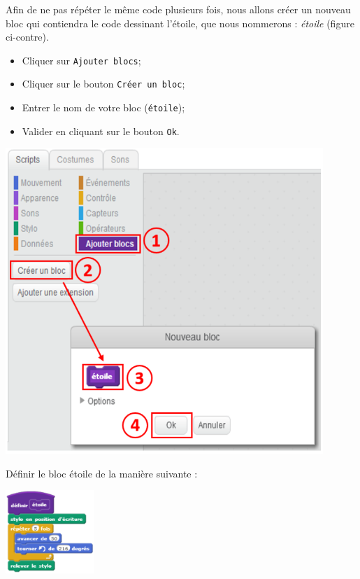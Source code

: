 \begin{minipage}[c]{0.55\linewidth}
Afin de ne pas répéter le même code plusieurs fois, nous allons créer un nouveau bloc qui contiendra le code dessinant l’étoile, que nous nommerons : \emph{étoile} (figure ci-contre).

\vspace{6pt}

  \begin{itemize}
    \item {} Cliquer sur \texttt{Ajouter blocs};
    \item {} Cliquer sur le bouton \texttt{Créer un bloc};
    \item {} Entrer le nom de votre bloc (\texttt{étoile});
    \item {} Valider en cliquant sur le bouton \texttt{Ok}.
  \end{itemize}
\end{minipage} \hfill%
\begin{minipage}[c]{0.38\linewidth}
  \includegraphics[width=0.9\textwidth]{./images/scratch03/fonction/Scratch_Fonctions_06}
\end{minipage}

Définir le bloc étoile de la manière suivante : 
 \begin{center}
 \includegraphics[width=0.25\textwidth]{./images/scratch03/fonction/Scratch_Fonctions_07}
 \end{center}

